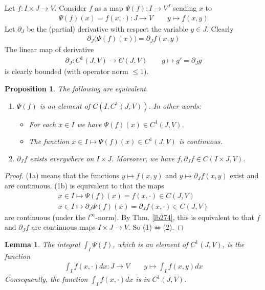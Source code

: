 \documentclass[12pt,b5paper,notitlepage]{article}
\theoremstyle{definition}
\theoremstyle{plain}
\newtheorem{pp}[df]{Proposition}
\newtheorem{lm}[df]{Lemma}
\numberwithin{equation}{section}
\begin{document}
Let $f:I\times J\rightarrow V$. Consider $f$ as a map $\Psi(f):I\rightarrow V^J$ sending $x$ to
\begin{align}
\Psi(f)(x)=f(x,\cdot):J\rightarrow V\qquad  y\mapsto f(x,y)
\end{align}
Let $\partial_J$ be the (partial) derivative with respect the variable $y\in J$. Clearly
\begin{align}
\partial_J\big(\Psi(f)(x)\big)=\partial_Jf(x,y)
\end{align}
The linear map of derivative
\begin{align}
\partial_J:C^1(J,V)\rightarrow C(J,V)\qquad g\mapsto g'=\partial_Jg
\end{align}
is clearly bounded (with operator norm $\leq 1$).

\begin{pp}\label{lb402}
The following are equivalent.
\begin{enumerate}[label=(\arabic*)]
\item $\Psi(f)$ is an element of $C(I,C^1(J,V))$. In other words:
\begin{itemize}
\item[(1a)] For each $x\in I$ we have $\Psi(f)(x)\in C^1(J,V)$.
\item[(1b)] The function $x\in I\mapsto \Psi(f)(x)\in C^1(J,V)$ is continuous.
\end{itemize}
\item $\partial_Jf$ exists everywhere on $I\times J$. Moreover, we have $f,\partial_Jf\in C(I\times J,V)$. 
\end{enumerate}
\end{pp}



\begin{proof}
(1a) means that the functions $y\mapsto f(x,y)$ and $y\mapsto \partial_Jf(x,y)$ exist and are continuous. (1b) is equivalent to that the maps
\begin{gather*}
x\in I\mapsto\Psi(f)(x)=f(x,\cdot)\in C(J,V)\\
x\in I\mapsto \partial_J\Psi(f)(x)=\partial_Jf(x,\cdot)\in C(J,V)
\end{gather*}
are continuous (under the $l^\infty$-norm). By Thm. \ref{lb274}, this is equivalent to that $f$ and $\partial_Jf$ are continuous maps $I\times J\rightarrow V$. So (1)$\Leftrightarrow$(2).
\end{proof}



\begin{lm}\label{lb403}
The integral  $\int_I\Psi(f)$, which is an element of $C^1(J,V)$, is the function
\begin{align}
\int_If(x,\cdot)dx:J\rightarrow V\qquad y\mapsto \int_I f(x,y)dx
\end{align}
Consequently, the function $\int_If(x,\cdot)dx$ is in $C^1(J,V)$.
\end{lm}
\end{document}

